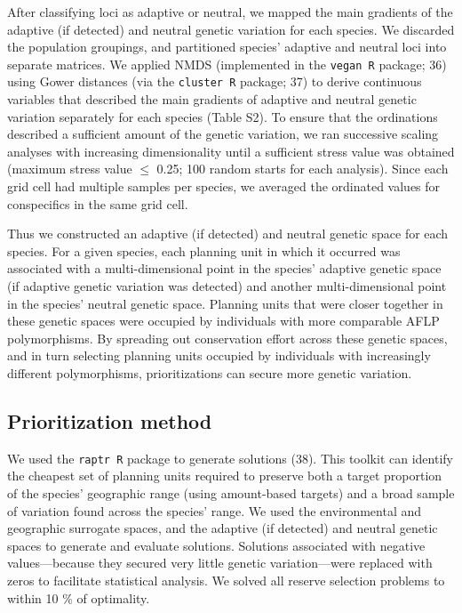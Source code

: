 \documentclass[9pt,twocolumn,twoside,lineno]{pnas-new}
\begin{document}
After classifying loci as adaptive or neutral, we mapped the main
gradients of the adaptive (if detected) and neutral genetic variation
for each species. We discarded the population groupings, and partitioned
species' adaptive and neutral loci into separate matrices. We applied
NMDS (implemented in the \texttt{vegan R} package; 36) using Gower
distances (via the \texttt{cluster R} package; 37) to derive continuous
variables that described the main gradients of adaptive and neutral
genetic variation separately for each species (Table S2). To ensure that
the ordinations described a sufficient amount of the genetic variation,
we ran successive scaling analyses with increasing dimensionality until
a sufficient stress value was obtained (maximum stress value \(\leq\)
0.25; 100 random starts for each analysis). Since each grid cell had
multiple samples per species, we averaged the ordinated values for
conspecifics in the same grid cell.

Thus we constructed an adaptive (if detected) and neutral genetic space
for each species. For a given species, each planning unit in which it
occurred was associated with a multi-dimensional point in the species'
adaptive genetic space (if adaptive genetic variation was detected) and
another multi-dimensional point in the species' neutral genetic space.
Planning units that were closer together in these genetic spaces were
occupied by individuals with more comparable AFLP polymorphisms. By
spreading out conservation effort across these genetic spaces, and in
turn selecting planning units occupied by individuals with increasingly
different polymorphisms, prioritizations can secure more genetic
variation.

\subsection*{Prioritization method}\label{prioritization-method}

We used the \texttt{raptr R} package to generate solutions (38). This
toolkit can identify the cheapest set of planning units required to
preserve both a target proportion of the species' geographic range
(using amount-based targets) and a broad sample of variation found
across the species' range. We used the environmental and geographic
surrogate spaces, and the adaptive (if detected) and neutral genetic
spaces to generate and evaluate solutions. Solutions associated with
negative values---because they secured very little genetic
variation---were replaced with zeros to facilitate statistical analysis.
We solved all reserve selection problems to within 10 \% of optimality.
\end{document}
